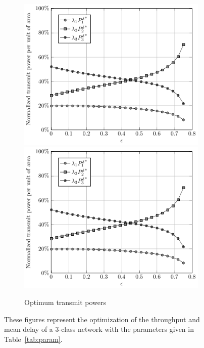 \begin{figure}
\begin{subfigure}[t]{.45\textwidth}
    \if{}
        \includegraphics[width=\textwidth]{Figures/Ch7_Opt_P_eps.pdf}
    \else
        \includegraphics[draft,width=\textwidth]{Figures/Ch7_Opt_P_eps.pdf}
    \fi
    \caption{Optimum transmit powers}
    \label{fig:Opt_P_eps}
\end{subfigure}
\caption{These figures represent the optimization of the throughput and mean delay of a 3-class network with the parameters given in Table~\ref{tab:param}.}
\label{fig:opt_eps}
\end{figure}

